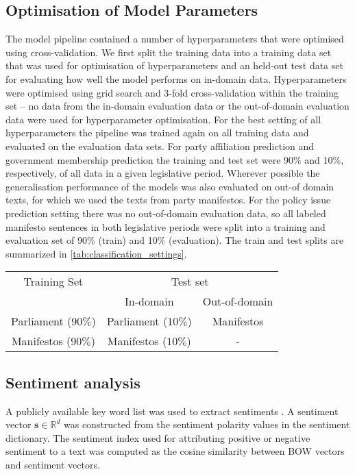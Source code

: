 \documentclass[11pt]{article}
\renewcommand{\vec}[1]{\mathbf{#1}}
\newcommand{\R}{\mathds{R}}
\begin{document}
\subsection{Optimisation of Model Parameters}\label{sec:crossvalidation}
The model pipeline contained a number of  hyperparameters that were optimised using cross-validation.
We first split the training data into a training data set that was used for optimisation of hyperparameters and an held-out test data set for evaluating how well the model performs on in-domain data. Hyperparameters were optimised using grid search and 3-fold cross-validation within the training set -- no data from the in-domain evaluation data or the out-of-domain evaluation data were used for hyperparameter optimisation. For the best setting of all hyperparameters the pipeline was trained again on all training data and evaluated on the evaluation data sets. For party affiliation prediction and government membership prediction the training and test set were 90\% and 10\%, respectively, of all data in a given legislative period. Wherever possible the generalisation performance of the models was also evaluated on out-of domain texts, for which we used the texts from party manifestos. For the policy issue prediction setting there was no out-of-domain evaluation data, so all labeled manifesto sentences in both legislative periods were split into a training and evaluation set of 90\% (train) and 10\% (evaluation). The train and test splits are summarized in \autoref{tab:classification_settings}.
% 
\begin{table}[t]\label{tab:classification_settings}
\footnotesize
\begin{tabular}{ccc}
Training Set & \multicolumn{2}{c}{Test set} \\
& In-domain&Out-of-domain\\
\hline
\hline
Parliament ($90\%$) & Parliament ($10\%$)& Manifestos\\
Manifestos ($90\%$)& Manifestos ($10\%$) & -\\
\end{tabular}
\end{table}


\subsection{Sentiment analysis}\label{sec:sentiment_analysis_methods}
A publicly available key word list was used to extract sentiments \cite{remquahey2010}. A sentiment vector $\vec{s}\in\R^d$ was constructed from the sentiment polarity values in the sentiment dictionary. The sentiment index used for attributing positive or negative sentiment to a text was computed as the cosine similarity between BOW vectors and sentiment vectors.
\end{document}
